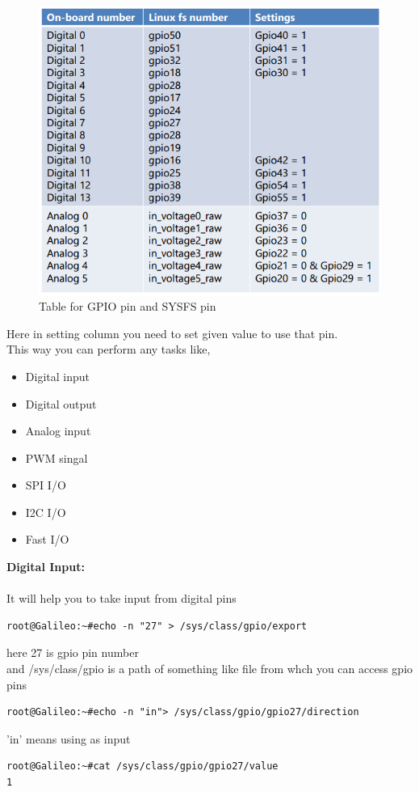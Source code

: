 \documentclass[11pt,a4paper]{article}
\begin{document}
\begin{figure}
	\includegraphics[width=\linewidth]{10.png}
    \caption{Table for GPIO pin and SYSFS pin}
    \end{figure}
   Here in setting column you need to set given value to use that pin.\\
   This way you can perform any tasks like,
   \begin{itemize}
\item 	Digital input
\item 	Digital output
\item	Analog input
\item	PWM singal
\item	SPI I/O
\item	I2C I/O
\item	Fast I/O

\end{itemize}
\newpage
\large{\textbf{Digital Input:}}\\
\vspace{.3cm}\\
It will help you to take input from digital pins\\

\begin{lstlisting}
root@Galileo:~#echo -n "27" > /sys/class/gpio/export
\end{lstlisting}
here 27 is gpio pin number\\

and /sys/class/gpio is a path of something like file from whch you can access gpio pins\\
\begin{lstlisting}
root@Galileo:~#echo -n "in"> /sys/class/gpio/gpio27/direction
\end{lstlisting}
'in' means using as input\\
\begin{lstlisting}
root@Galileo:~#cat /sys/class/gpio/gpio27/value
1
\end{lstlisting}
\end{document}
